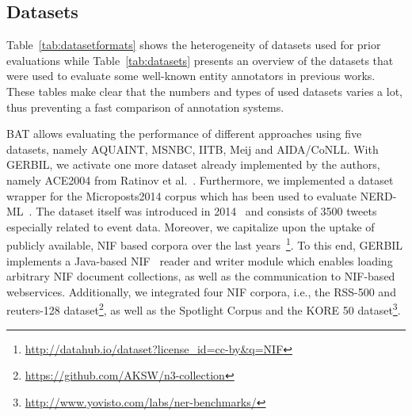 
\subsection{Datasets}
\label{sec:datasets}

Table~\ref{tab:datasetformats} shows the heterogeneity of datasets used for prior evaluations while Table~\ref{tab:datasets} presents an overview of the datasets that were used to evaluate some well-known entity annotators in previous works.
These tables make clear that the numbers and types of used datasets varies a lot, thus preventing a fast comparison of annotation systems.







BAT allows evaluating the performance of different a\-ppro\-aches using five datasets, namely AQUAINT, MSNBC, IITB, Meij and AIDA/CoNLL.
With GERBIL, we activate one more dataset already implemented by the authors, namely ACE2004 from Ratinov et al.~\cite{rat:rot}.
Furthermore, we implemented a dataset wrapper for the Microposts2014 corpus which has been used to evaluate NERD-ML~\cite{rizzo2014}. 
The dataset itself was introduced in 2014~\cite{Cano2014} and consists of 3500 tweets especially related to event data.
Moreover, we capitalize upon the uptake of publicly available, NIF based corpora over the last years~\cite{yovisto,n3}\footnote{\url{http://datahub.io/dataset?license_id=cc-by&q=NIF}}.
To this end, GERBIL implements a Java-based NIF~\cite{NIF} reader and writer module which enables loading arbitrary NIF document collections, as well as the communication to NIF-based webservices.
Additionally, we integrated four NIF corpora, i.e., the RSS-500 and reuters-128 dataset\footnote{\url{https://github.com/AKSW/n3-collection}}, as well as the Spotlight Corpus and the KORE 50 dataset\footnote{\url{http://www.yovisto.com/labs/ner-benchmarks/}}. 

